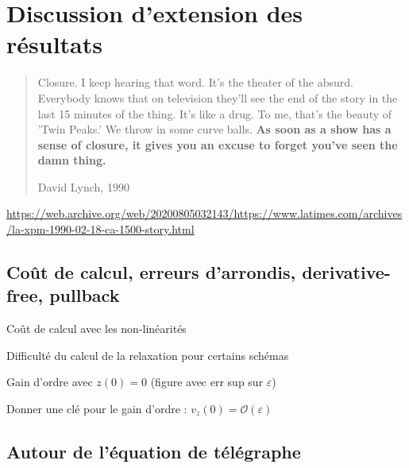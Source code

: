 
\clearemptydoublepage
\chapter{Discussion d'extension des résultats}

\begin{quote}
    Closure. I keep hearing that word. It's the theater of the absurd. Everybody knows that on television they'll see the end of the story in the last 15 minutes of the thing. It's like a drug. To me, that's the beauty of 'Twin Peaks.' We throw in some curve balls. \textbf{As soon as a show has a sense of closure, it gives you an excuse to forget you've seen the damn thing.}

    \hfil%
    David Lynch, 1990
\end{quote}
\url{https://web.archive.org/web/20200805032143/https://www.latimes.com/archives/la-xpm-1990-02-18-ca-1500-story.html}

\section{Coût de calcul, erreurs d’arrondis, derivative-free, pullback}

Coût de calcul avec les non-linéarités

Difficulté du calcul de la relaxation pour certains schémas

Gain d’ordre avec $z(0) = 0$ (figure avec err sup sur $\varepsilon$)

Donner une clé pour le gain d’ordre : $v_z(0) = \mathcal{O}(\varepsilon)$


\section{Autour de l’équation de télégraphe}

